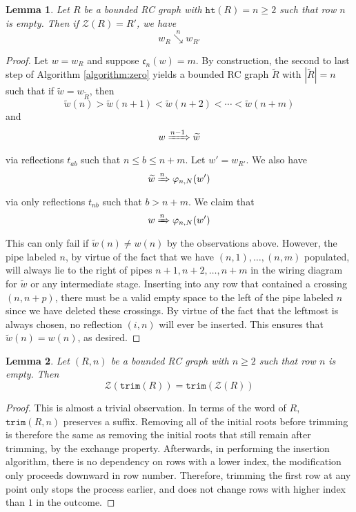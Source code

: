 \documentclass{amsart}
\newtheorem{lemma}{Lemma}[subsection]
\theoremstyle{definition}
\theoremstyle{remark}
\numberwithin{equation}{subsection}
\newcommand{\downvar}[1]{\stackrel{#1}{\searrow}}
\newcommand{\wof}[1]{w_{#1}}
\newcommand{\Tom}[1]{\xRightarrow{#1}}
\newcommand{\trm}{\mathtt{trim}}
\newcommand{\zeromap}{\mathcal{Z}}
\newcommand{\hr}{\mathtt{ht}}
\newcommand{\code}{\mathfrak{c}}
\begin{document}
\begin{lemma} \label{lemma:zerotransition}
Let $R$ be a bounded RC graph with $\hr(R)=n\geq 2$ such that row $n$ is empty. Then if $\zeromap(R) = R'$, we have
$$\wof{R}\downvar{n} \wof{R'}$$
\end{lemma}
\begin{proof}
Let $w=\wof{R}$ and suppose $\code_n(w) = m$. By construction, the second to last step of Algorithm \ref{algorithm:zero} yields a bounded RC graph $\widetilde{R}$ with $|\widetilde{R}|=n$ such that if $\widetilde{w} = \wof{\widetilde{R}}$, then
$$\widetilde{w}(n) > \widetilde{w}(n+1) < \widetilde{w}(n+2) < \cdots < \widetilde{w}(n + m)$$
and
$$w\Tom{n-1}\widetilde{w}$$
via reflections $t_{ab}$ such that $n\leq b\leq n+m$. Let $w' = \wof{R'}$. We also have
$$\widetilde{w}\Tom{n}\varphi_{n, N}(w')$$
via only reflections $t_{nb}$ such that $b>n+m$. We claim that
$$w\Tom{n} \varphi_{n, N}(w')$$
This can only fail if $\widetilde{w}(n)\neq w(n)$ by the observations above. However, the pipe labeled $n$, by virtue of the fact that we have $(n,1),\ldots,(n,m)$ populated, will always lie to the right of pipes $n+1,n+2,\ldots,n+m$ in the wiring diagram for $\widetilde{w}$ or any intermediate stage. Inserting into any row that contained a crossing $(n, n+p)$, there must be a valid empty space to the left of the pipe labeled $n$ since we have deleted these crossings. By virtue of the fact that the leftmost is always chosen, no reflection $(i,n)$ will ever be inserted. This ensures that $\widetilde{w}(n) = w(n)$, as desired.
\end{proof}


\begin{lemma} \label{lemma:ztrim}
Let $(R, n)$ be a bounded RC graph with $n\geq 2$ such that row $n$ is empty. Then
$$\zeromap(\trm(R)) = \trm(\zeromap(R))$$
\end{lemma}
\begin{proof}
This is almost a trivial observation. In terms of the word of $R$, $\trm(R, n)$ preserves a suffix. Removing all of the initial roots before trimming is therefore the same as removing the initial roots that still remain after trimming, by the exchange property. Afterwards, in performing the insertion algorithm, there is no dependency on rows with a lower index, the modification only proceeds downward in row number. Therefore, trimming the first row at any point only stops the process earlier, and does not change rows with higher index than $1$ in the outcome.
\end{proof}
\end{document}
